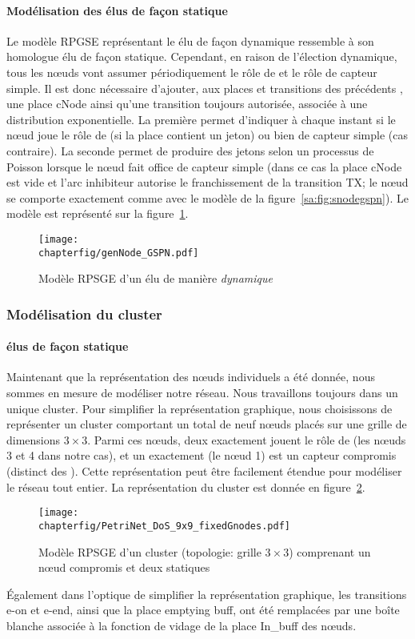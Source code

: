             \paragraph{Modélisation des \cns élus de façon statique}
Le modèle RPGSE représentant le \cn élu de façon dynamique ressemble à son homologue élu de façon statique.
Cependant, en raison de l'élection dynamique, tous les nœuds vont assumer périodiquement le rôle de \cn et le rôle de capteur simple.
Il est donc nécessaire d'ajouter, aux places et transitions des précédents \cns, une place \textsf{cNode} ainsi qu'une transition toujours autorisée, associée à une distribution exponentielle.
La première permet d'indiquer à chaque instant si le nœud joue le rôle de \cn (si la place contient un jeton) ou bien de capteur simple (cas contraire).
La seconde permet de produire des jetons selon un processus de Poisson lorsque le nœud fait office de capteur simple (dans ce cas la place \textsf{cNode} est vide et l'arc inhibiteur autorise le franchissement de la transition \textsf{TX}; le nœud se comporte exactement comme avec le modèle de la figure~\ref{sa:fig:snodegspn}).
Le modèle est représenté sur la figure~\ref{sa:fig:cnodegspn2}.
\begin{figure}[H]
    \centering
    \texttt{[image: \\chapterfig/genNode\_GSPN.pdf]}
    \caption{Modèle RPSGE d'un \cn élu de manière \emph{dynamique}}\label{sa:fig:cnodegspn2}
\end{figure}

        \subsubsection{Modélisation du cluster}

            \paragraph{\cns élus de façon statique}
Maintenant que la représentation des nœuds individuels a été donnée, nous sommes en mesure de modéliser notre réseau.
Nous travaillons toujours dans un unique cluster.
Pour simplifier la représentation graphique, nous choisissons de représenter un cluster comportant un total de neuf nœuds placés sur une grille de dimensions $3\times3$.
Parmi ces nœuds, deux exactement jouent le rôle de \cn (les nœuds \textsf{3} et \textsf{4} dans notre cas), et un exactement (le nœud \textsf{1}) est un capteur compromis (distinct des \cns).
Cette représentation peut être facilement étendue pour modéliser le réseau tout entier.
La représentation du cluster est donnée en figure~\ref{sa:fig:petricluster}.
\begin{figure}[H]
    \centering
    \texttt{[image: \\chapterfig/PetriNet\_DoS\_9x9\_fixedGnodes.pdf]}
    \caption{Modèle RPSGE d'un cluster (topologie: grille $3\times3$) comprenant un nœud compromis et deux \cns statiques}\label{sa:fig:petricluster}
\end{figure}
Également dans l'optique de simplifier la représentation graphique, les transitions \textsf{e-on} et \textsf{e-end}, ainsi que la place \textsf{emptying buff}, ont été remplacées par une boîte blanche associée à la fonction de vidage de la place \textsf{In\_buff} des nœuds.

